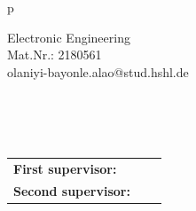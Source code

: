 \begin{center}
\begin{tabular}{p{\textwidth}}
\begin{center}
Electronic Engineering\\%
Mat.Nr.: 2180561\\
olaniyi-bayonle.alao@stud.hshl.de\\
\vspace{0.5cm}
\large{\mydate}


\end{center}

\\
\\
\\

\begin{center}
\begin{tabular}{lll}
\textbf{First supervisor:} & & \firstexaminer\\
\textbf{Second supervisor:} & & \secondexaminer\\
\end{tabular}
\end{center}

\end{tabular}
\end{center}